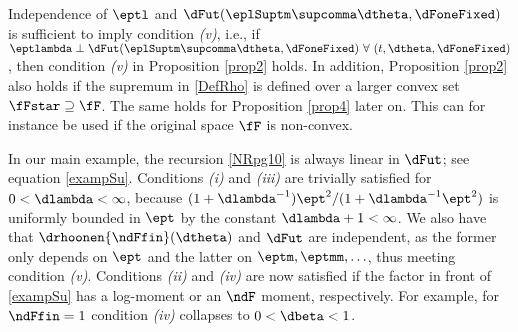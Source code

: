 \begin{rem} \rm
\label{remprop2}
Independence of $\eptl$ and $\dFut(\eplSuptm\supcomma\dtheta,\dFoneFixed)$ is sufficient to imply condition \textit{(v)}, i.e.,
if
$\eptlambda \perp \dFut(\eplSuptm\supcomma\dtheta,\dFoneFixed) \ \forall \ (t,\dtheta,\dFoneFixed)$,
then condition \textit{(v)} in Proposition \ref{prop2} holds.
In addition, Proposition \ref{prop2} also holds if the supremum in \eqref{DefRho} is defined over a larger convex set $\fFstar \supseteq \fF$. The same holds for Proposition \ref{prop4} later on. This can for instance be used if the original space $\fF$ is non-convex.
\end{rem}


\begin{exmc} %
In our main example, the recursion \eqref{NRpg10} is always linear in $\dFut$; see equation \eqref{exampSu}. 
Conditions \textit{(i)} and \textit{(iii)} are trivially satisfied for $0<\dlambda<\infty$, because $(1+\dlambda^{-1})\ept^2/(1+\dlambda^{-1}\ept^2)$ is uniformly bounded in $\ept$ by the constant $\dlambda+1 < \infty$. 
We also have that $\drhoonen{\ndFfin}(\dtheta)$ and $\dFut$ are independent, as the former only depends on $\ept$ and the latter on $\eptm, \eptmm, \ldots$, thus meeting condition \textit{(v)}. 
Conditions \textit{(ii)} and \textit{(iv)} are now satisfied if the factor in front of \eqref{exampSu} has a log-moment or an $\ndF$ moment, respectively. For example, for $\ndFfin=1$ condition \textit{(iv)} collapses to $0<\dbeta<1$.
\end{exmc}


